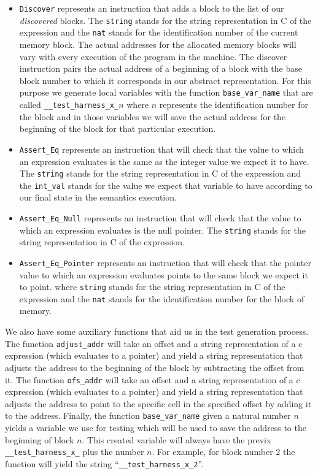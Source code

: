 \begin{itemize}
  \item{\verb|Discover| represents an instruction that adds a block to the list of our \textit{discovered} blocks.
  The \verb|string| stands for the string representation in C of the expression and the \verb|nat| stands for the identification number of the current memory block.
  The actual addresses for the allocated memory blocks will vary with every execution of the program in the machine.
  The discover instruction pairs the actual address of a beginning of a block with the base block number to which it corresponds in our abstract representation.
  For this purpose we generate local variables with the function \verb|base_var_name| that are called \verb|__test_harness_x_|$n$ where $n$ represents the identification number for the block and in those variables we will save the actual address for the beginning of the block for that particular execution.}
  \item{\verb|Assert_Eq| represents an instruction that will check that the value to which an expression evaluates is the same as the integer value we expect it to have.
  The \verb|string| stands for the string representation in C of the expression and the \verb|int_val| stands for the value we expect that variable to have according to our final state in the semantics execution.}
  \item{\verb|Assert_Eq_Null| represents an instruction that will check that the value to which an expression evaluates is the null pointer.
  The \verb|string| stands for the string representation in C of the expression.}
  \item{\verb|Assert_Eq_Pointer| represents an instruction that will check that the pointer value to which an expression evaluates points to the same block we expect it to point.
  where \verb|string| stands for the string representation in C of the expression and the \verb|nat| stands for the identification number for the block of memory.}
\end{itemize}

We also have some auxiliary functions that aid us in the test generation process.
The function \verb|adjust_addr| will take an offset and a string representation of a c expression (which evaluates to a pointer) and yield a string representation that adjusts the address to the beginning of the block by subtracting the offset from it.
The function \verb|ofs_addr| will take an offset and a string representation of a c expression (which evaluates to a pointer) and yield a string representation that adjusts the address to point to the specific cell in the specified offset by adding it to the address.
Finally, the function \verb|base_var_name| given a natural number $n$ yields a variable we use for testing which will be used to save the address to the beginning of block $n$.
This created variable will always have the previx \verb|__test_harness_x_| plus the number $n$.
For example, for block number $2$ the function will yield the string ``\verb|__test_harness_x_2|''.


